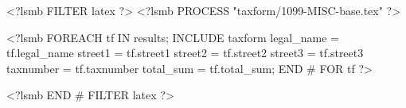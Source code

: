<?lsmb FILTER latex ?>
<?lsmb PROCESS "taxform/1099-MISC-base.tex" ?>

<?lsmb FOREACH tf IN results;
INCLUDE taxform 
legal_name = tf.legal_name
street1 = tf.street1
street2 = tf.street2
street3 = tf.street3
taxnumber = tf.taxnumber
total_sum = tf.total_sum;
END # FOR tf  ?>

<?lsmb END # FILTER latex ?>
